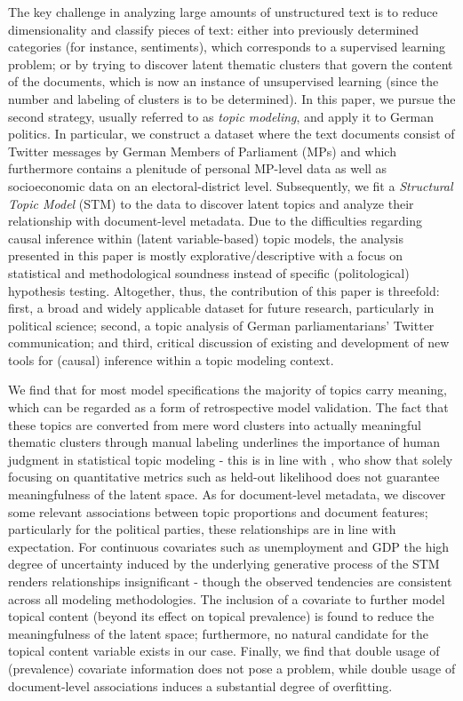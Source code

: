 The key challenge in analyzing large amounts of unstructured text is to reduce dimensionality and classify pieces of text: either into previously determined categories (for instance, sentiments), which corresponds to a supervised learning problem; or by trying to discover latent thematic clusters that govern the content of the documents, which is now an instance of unsupervised learning (since the number and labeling of clusters is to be determined). In this paper, we pursue the second strategy, usually referred to as \textit{topic modeling}, and apply it to German politics. In particular, we construct a dataset where the text documents consist of Twitter messages by German Members of Parliament (MPs) and which furthermore contains a plenitude of personal MP-level data as well as socioeconomic data on an electoral-district level. Subsequently, we fit a \textit{Structural Topic Model} (STM) to the data to discover latent topics and analyze their relationship with document-level metadata. Due to the difficulties regarding causal inference within (latent variable-based) topic models, the analysis presented in this paper is mostly explorative/descriptive with a focus on statistical and methodological soundness instead of specific (politological) hypothesis testing. Altogether, thus, the contribution of this paper is threefold: first, a broad and widely applicable dataset for future research, particularly in political science; second, a topic analysis of German parliamentarians' Twitter communication; and third, critical discussion of existing and development of new tools for (causal) inference within a topic modeling context.

We find that for most model specifications the majority of topics carry meaning, which can be regarded as a form of retrospective model validation. The fact that these topics are converted from mere word clusters into actually meaningful thematic clusters through manual labeling underlines the importance of human judgment in statistical topic modeling - this is in line with \cite{chang2009reading}, who show that solely focusing on quantitative metrics such as held-out likelihood does not guarantee meaningfulness of the latent space. As for document-level metadata, we discover some relevant associations between topic proportions and document features; particularly for the political parties, these relationships are in line with expectation. For continuous covariates such as unemployment and GDP the high degree of uncertainty induced by the underlying generative process of the STM renders relationships insignificant - though the observed tendencies are consistent across all modeling methodologies. The inclusion of a covariate to further model topical content (beyond its effect on topical prevalence) is found to reduce the meaningfulness of the latent space; furthermore, no natural candidate for the topical content variable exists in our case. Finally, we find that double usage of (prevalence) covariate information does not pose a problem, while double usage of document-level associations induces a substantial degree of overfitting.

